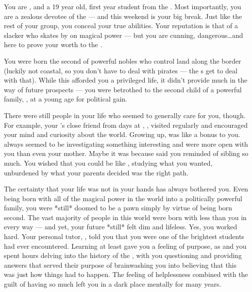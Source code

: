 \documentclass[char]{GL2020}
\begin{document}
\name{\cChupStudent{}}
 
You are \cChupStudent{\intro}, and a 19 year old, first year student from the \pFarm{}. Most importantly, you are a zealous devotee of the \pGoaties{} — and this weekend is your big break. Just like the rest of your group, you conceal your true abilities. Your reputation is that of a slacker who skates by on \cChupStudent{\their} magical power — but you are cunning, dangerous\ldots and here to prove your worth to the \pGoaties{}.
 
You were born the second \cChupStudent{\offspring} of powerful nobles who control land along the \pTech{} border (luckily not coastal, so you don't have to deal with pirates — the \cWildCard{\formal}s get to deal with that). While this afforded you a privileged life, it didn't provide much in the way of future prospects — you were betrothed to the second child of a powerful \pTech{} family, \cHeir{\intro}, at a young age for political gain. 

There were still people in your life who seemed to generally care for you, though. For example, your \cWildCardFriend{\parent}’s close friend from \cWildCardFriend{\their} days at \pSchool{}, \cWildCard{\intro}, visited regularly and encouraged your mind and curiosity about the world. Growing up, \cWildCard{} was like a bonus \cWildCard{\auncle} to you. \cWildCard{\They} always seemed to be investigating something interesting and were more open with you than even your mother. Maybe it was because  \cWildCard{\they} said you reminded \cWildCard{\them} of \cWildCard{\their} sibling so much. You wished that you could be like \cWildCard{\them}, studying what you wanted, unburdened by what your parents decided was the right path.

The certainty that your life was not in your hands has always bothered you. Even being born with all of the magical power in the world into a politically powerful family, you were *still* doomed to be a pawn simply by virtue of being born second. The vast majority of people in this world were born with less than you in every way — and yet, your future *still* felt dim and lifeless. Yes, you worked hard. Your personal tutor, \cHistory{\intro}, told you that you were one of the brightest students \cHistory{\they} had ever encountered. Learning at least gave you a feeling of purpose, as \cHistory{} and you spent hours delving into the history of the \pFarm{}, with you questioning and \cHistory{\them} providing answers that served their purpose of brainwashing you into believing that this was just how things had to happen. The feeling of helplessness combined with the guilt of having so much left you in a dark place mentally for many years. 
 
\end{document}
